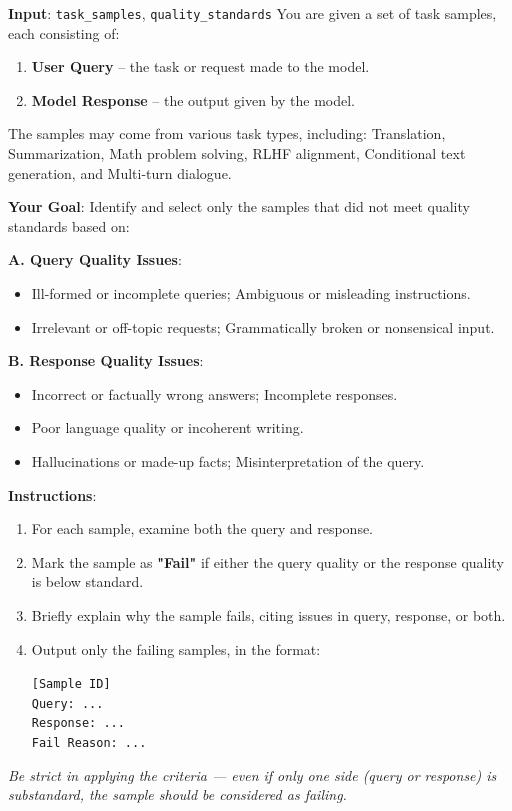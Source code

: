 \begin{tcolorbox}[promptbox, title={DATA\_FILTER\_PROMPT}]
\textbf{Input}: \texttt{task\_samples}, \texttt{quality\_standards}
\tcblower
You are given a set of task samples, each consisting of:
\begin{enumerate}
    \item \textbf{User Query} – the task or request made to the model.
    \item \textbf{Model Response} – the output given by the model.
\end{enumerate}

The samples may come from various task types, including: Translation, Summarization, Math problem solving, RLHF alignment, Conditional text generation, and Multi-turn dialogue.

\textbf{Your Goal}: Identify and select only the samples that did not meet quality standards based on:

\medskip
\textbf{A. Query Quality Issues}:
\begin{itemize}
    \item Ill-formed or incomplete queries; Ambiguous or misleading instructions.
    \item Irrelevant or off-topic requests; Grammatically broken or nonsensical input.
\end{itemize}

\textbf{B. Response Quality Issues}:
\begin{itemize}
    \item Incorrect or factually wrong answers; Incomplete responses.
    \item Poor language quality or incoherent writing.
    \item Hallucinations or made-up facts; Misinterpretation of the query.
\end{itemize}

\textbf{Instructions}:
\begin{enumerate}
    \item For each sample, examine both the query and response.
    \item Mark the sample as \textbf{"Fail"} if either the query quality or the response quality is below standard.
    \item Briefly explain why the sample fails, citing issues in query, response, or both.
    \item Output only the failing samples, in the format:
    \begin{tcolorbox}[colback=white, colframe=gray!20, size=minimal, left=2mm, top=1mm, bottom=1mm]
        \texttt{[Sample ID]} \\
        \texttt{Query: ...} \\
        \texttt{Response: ...} \\
        \texttt{Fail Reason: ...}
    \end{tcolorbox}
\end{enumerate}

\textit{Be strict in applying the criteria — even if only one side (query or response) is substandard, the sample should be considered as failing.}
\end{tcolorbox}